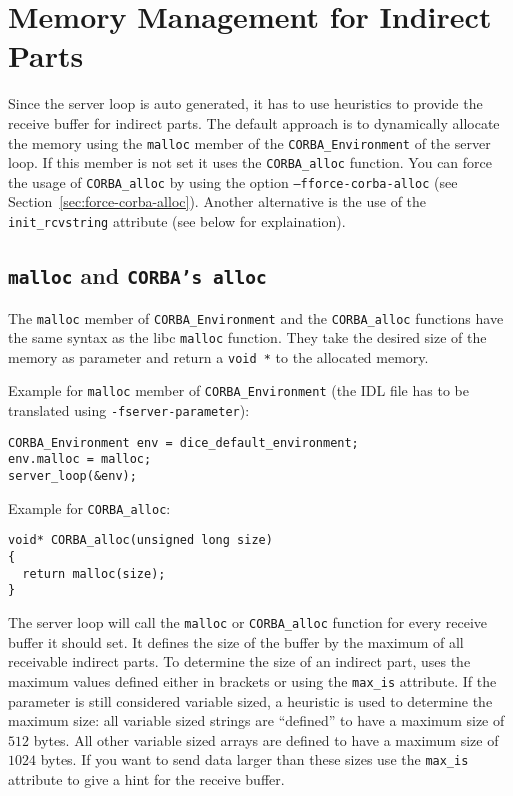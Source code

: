 \section{Memory Management for Indirect Parts}
\label{sec:mem-indirect-parts}
Since the server loop is auto generated, it has to use heuristics
to provide the receive buffer for indirect parts. The default
approach is to dynamically allocate the memory using the
\verb|malloc| member of the \verb|CORBA_Environment| of the server
loop. If this member is not set it uses the \verb|CORBA_alloc| 
function. You can force the usage of \verb|CORBA_alloc| by using
the option {\tt --fforce-corba-alloc} (see Section~\ref{sec:force-corba-alloc}). 
Another alternative is the use of the \verb|init_rcvstring| 
attribute (see below for explaination).

\subsection{{\tt malloc} and {\tt CORBA's alloc}}

The \verb|malloc| member of \verb|CORBA_Environment| and 
the \verb|CORBA_alloc| functions have the same
syntax as the libc \verb|malloc| function. They take the desired
size of the memory as parameter and return a \verb|void *| to the
allocated memory.

Example for \verb|malloc| member of \verb|CORBA_Environment| (the
IDL file has to be translated using \verb|-fserver-parameter|):
\begin{verbatim}
CORBA_Environment env = dice_default_environment;
env.malloc = malloc;
server_loop(&env);
\end{verbatim}

Example for \verb|CORBA_alloc|:
\begin{verbatim}
void* CORBA_alloc(unsigned long size)
{
  return malloc(size);
}
\end{verbatim}

The server loop will call the \verb|malloc| or \verb|CORBA_alloc|
function for every receive buffer it should set. It defines the
size of the buffer by the maximum of all receivable indirect parts.
To determine the size of an indirect part, \dice{} uses the
maximum values defined either in brackets or using the \verb|max_is|
attribute. If the parameter is still considered variable sized, a
heuristic is used to determine the maximum size: all variable sized
strings are ``defined'' to have a maximum size of $512$ bytes. All
other variable sized arrays are defined to have a maximum size of
$1024$ bytes. If you want to send data larger than these sizes use
the \verb|max_is| attribute to give \dice{} a hint for the receive
buffer.

